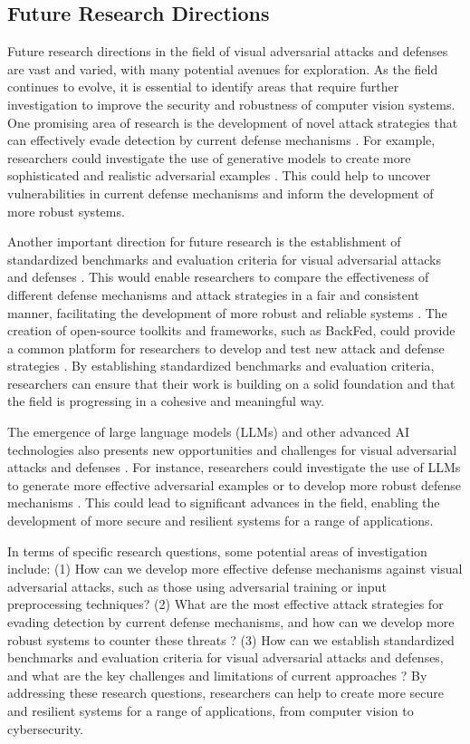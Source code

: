 \documentclass[11pt]{article}
\begin{document}
\subsection{Future Research Directions}

Future research directions in the field of visual adversarial attacks and defenses are vast and varied, with many potential avenues for exploration. As the field continues to evolve, it is essential to identify areas that require further investigation to improve the security and robustness of computer vision systems. One promising area of research is the development of novel attack strategies that can effectively evade detection by current defense mechanisms \cite{ref171}. For example, researchers could investigate the use of generative models to create more sophisticated and realistic adversarial examples \cite{ref220}. This could help to uncover vulnerabilities in current defense mechanisms and inform the development of more robust systems.

Another important direction for future research is the establishment of standardized benchmarks and evaluation criteria for visual adversarial attacks and defenses \cite{ref221}. This would enable researchers to compare the effectiveness of different defense mechanisms and attack strategies in a fair and consistent manner, facilitating the development of more robust and reliable systems \cite{ref222}. The creation of open-source toolkits and frameworks, such as BackFed, could provide a common platform for researchers to develop and test new attack and defense strategies \cite{ref223}. By establishing standardized benchmarks and evaluation criteria, researchers can ensure that their work is building on a solid foundation and that the field is progressing in a cohesive and meaningful way.

The emergence of large language models (LLMs) and other advanced AI technologies also presents new opportunities and challenges for visual adversarial attacks and defenses \cite{ref224}. For instance, researchers could investigate the use of LLMs to generate more effective adversarial examples or to develop more robust defense mechanisms \cite{ref225}. This could lead to significant advances in the field, enabling the development of more secure and resilient systems for a range of applications.

In terms of specific research questions, some potential areas of investigation include: (1) How can we develop more effective defense mechanisms against visual adversarial attacks, such as those using adversarial training or input preprocessing techniques? (2) What are the most effective attack strategies for evading detection by current defense mechanisms, and how can we develop more robust systems to counter these threats \cite{ref226}? (3) How can we establish standardized benchmarks and evaluation criteria for visual adversarial attacks and defenses, and what are the key challenges and limitations of current approaches \cite{ref227}? By addressing these research questions, researchers can help to create more secure and resilient systems for a range of applications, from computer vision to cybersecurity.
\end{document}
